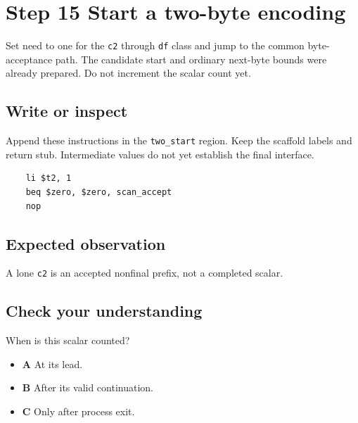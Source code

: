 \section{Step 15 Start a two-byte encoding}\label{utf8-s15}

Set need to one for the \texttt{c2} through \texttt{df} class and jump to the common byte-acceptance path. The candidate start and ordinary next-byte bounds were already prepared. Do not increment the scalar count yet.

\subsection{Write or inspect}
Append these instructions in the \texttt{two\_start} region. Keep the scaffold labels and return stub. Intermediate values do not yet establish the final interface.

\begin{verbatim}
    li $t2, 1
    beq $zero, $zero, scan_accept
    nop
\end{verbatim}

\subsection{Expected observation}
A lone \texttt{c2} is an accepted nonfinal prefix, not a completed scalar.

\subsection{Check your understanding}
When is this scalar counted?

\begin{itemize}
  \item \textbf{A} At its lead.
  \item \textbf{B} After its valid continuation.
  \item \textbf{C} Only after process exit.
\end{itemize}

